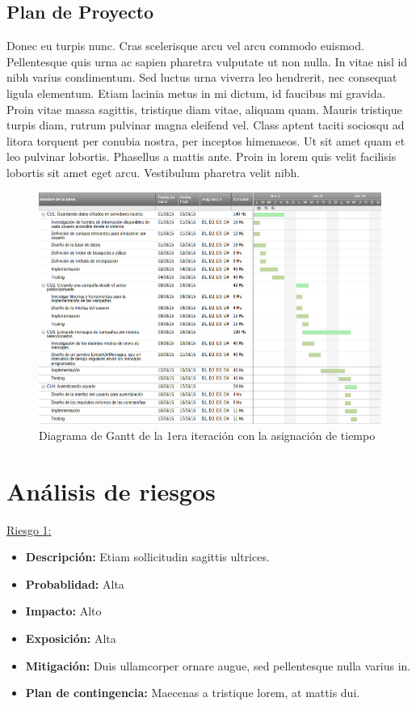 \documentclass[a4paper, 10pt, twoside]{article}
\newcommand{\riesgo}[7]{
  \underline{Riesgo {#1}:}
  \begin{itemize}   
    \item \textbf{Descripción:} {#2}
    \item \textbf{Probablidad:} {#3}
    \item \textbf{Impacto:} {#4}
    \item \textbf{Exposición:} {#5}
    \item \textbf{Mitigación:} {#6}
    \item \textbf{Plan de contingencia:} {#7}
  \end{itemize}
}
\begin{document}
\subsection{Plan de Proyecto}
Donec eu turpis nunc. Cras scelerisque arcu vel arcu commodo euismod. Pellentesque quis urna ac sapien pharetra vulputate ut non nulla. In vitae nisl id nibh varius condimentum. Sed luctus urna viverra leo hendrerit, nec consequat ligula elementum. Etiam lacinia metus in mi dictum, id faucibus mi gravida. Proin vitae massa sagittis, tristique diam vitae, aliquam quam. Mauris tristique turpis diam, rutrum pulvinar magna eleifend vel. Class aptent taciti sociosqu ad litora torquent per conubia nostra, per inceptos himenaeos. Ut sit amet quam et leo pulvinar lobortis. Phasellus a mattis ante. Proin in lorem quis velit facilisis lobortis sit amet eget arcu. Vestibulum pharetra velit nibh.

\begin{landscape}
\begin{figure}[h!]
  \centering
  \includegraphics[width=20cm]{gantt.png}
  \caption{Diagrama de Gantt de la 1era iteración con la asignación de tiempo}
  \label{fig:gantt}
\end{figure}
\end{landscape}
\newpage


\section{Análisis de riesgos}
\label{riesgos:r1}
\riesgo{1}
    {Etiam sollicitudin sagittis ultrices.}
    {Alta}
    {Alto}
    {Alta}
    {Duis ullamcorper ornare augue, sed pellentesque nulla varius in.}
    {Maecenas a tristique lorem, at mattis dui.}
\end{document}

